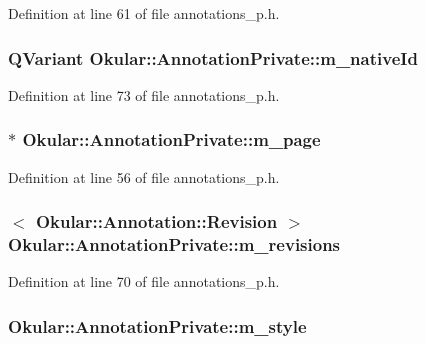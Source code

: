 Definition at line 61 of file annotations\+\_\+p.\+h.

\hypertarget{classOkular_1_1AnnotationPrivate_a00a26a3364d1f9f13889e6d5c8fe4cb0}{
\subsubsection[{m\+\_\+native\+Id}]{\setlength{\rightskip}{0pt plus 5cm}Q\+Variant Okular\+::\+Annotation\+Private\+::m\+\_\+native\+Id}}\label{classOkular_1_1AnnotationPrivate_a00a26a3364d1f9f13889e6d5c8fe4cb0}


Definition at line 73 of file annotations\+\_\+p.\+h.

\hypertarget{classOkular_1_1AnnotationPrivate_a2db3806670326880d0d7e6e1986d35f4}{
\subsubsection[{m\+\_\+page}]{$\ast$ Okular\+::\+Annotation\+Private\+::m\+\_\+page}}\label{classOkular_1_1AnnotationPrivate_a2db3806670326880d0d7e6e1986d35f4}


Definition at line 56 of file annotations\+\_\+p.\+h.

\hypertarget{classOkular_1_1AnnotationPrivate_ab1c9337e62d1d85d6f3b9d0dc120fc8d}{
\subsubsection[{m\+\_\+revisions}]{$<$ {\bf Okular\+::\+Annotation\+::\+Revision} $>$ Okular\+::\+Annotation\+Private\+::m\+\_\+revisions}}\label{classOkular_1_1AnnotationPrivate_ab1c9337e62d1d85d6f3b9d0dc120fc8d}


Definition at line 70 of file annotations\+\_\+p.\+h.

\hypertarget{classOkular_1_1AnnotationPrivate_af49e79222d9e16611c0abd90533bc206}{
\subsubsection[{m\+\_\+style}]{ Okular\+::\+Annotation\+Private\+::m\+\_\+style}}\label{classOkular_1_1AnnotationPrivate_af49e79222d9e16611c0abd90533bc206}


